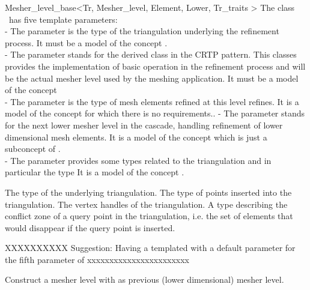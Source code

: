 \begin{ccRefClass}{Mesher_level_base<Tr, Mesher_level, Element, Lower,
Tr_traits >}
\ccParameters
The class \ccRefName\ has five template parameters: \\
- The parameter  is the type of the triangulation underlying
 the refinement process. It must be a model of the concept 
 .\\
- The parameter  stands for the derived class
in the CRTP pattern. This classes provides the implementation
of basic operation in  the refinement process and will be the actual
mesher level used by the meshing application. 
It must be a model of the concept  \\
- The parameter  is the type of mesh elements 
refined at  this level refines. It is a model of the concept
 for which there is no requirements..
- The parameter  stands for the  next lower  mesher level
 in the cascade, handling refinement of lower dimensional mesh
elements.  It is a model of the concept
 which is just a subconcept of
.\\
- The parameter  provides some types related
to the triangulation and in particular the type  
 It is a model of the concept .




{The type of the underlying triangulation.}
\ccGlue
{}
{The type of points inserted into the triangulation.}
\ccGlue
{}
{ The vertex handles of the triangulation.}
\ccGlue
{}
{A type describing the conflict zone of a query point in the triangulation,
i.e. the set of elements that would disappear if the query point is
inserted.
}

XXXXXXXXXX
Suggestion: Having a templated 
with a default parameter  
for the fifth parameter of   
xxxxxxxxxxxxxxxxxxxxxxx


\ccCreation
{}  %

{Construct a mesher level with  as previous 
(lower dimensional) mesher level.}




\end{ccRefClass}
